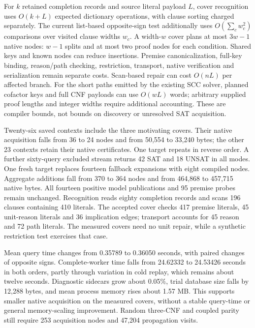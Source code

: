 \documentclass[11pt,a4paper]{article}
\numberwithin{equation}{section}
\theoremstyle{plain}
\theoremstyle{definition}
\theoremstyle{remark}
\begin{document}
For $k$ retained completion records and source literal payload $L$, cover
recognition uses $O(k+L)$ expected dictionary operations, with clause sorting
charged separately. The current list-based opposite-sign test additionally
uses $O(\sum_c w_c^2)$ comparisons over visited clause widths $w_c$.
A width-$w$ cover plans at most $3w-1$ native nodes:
$w-1$ splits and at most two proof nodes for each condition. Shared keys and
known nodes can reduce insertions. Premise canonicalization, full-key binding,
reason/path checking, restriction, transport, native verification and
serialization remain separate costs. Scan-based repair can cost $O(nL)$ per
affected branch. For the short paths emitted by the existing SCC solver,
planned cofactor keys and full CNF payloads can use $O(wL)$ words; arbitrary
supplied proof lengths and integer widths require additional accounting. These
are compiler bounds, not bounds on discovery or unresolved SAT acquisition.

Twenty-six saved contexts include the three motivating covers. Their native
acquisition falls from 36 to 24 nodes and from 50,554 to 33,240 bytes; the other
23 contexts retain their native certificates. One target repeats in reverse
order. A further sixty-query excluded stream returns 42 SAT and 18 UNSAT in
all modes. One fresh target replaces fourteen fallback expansions with eight
compiled nodes. Aggregate additions fall from 370 to 364 nodes and from
464,868 to 457,715 native bytes. All fourteen positive model publications and
95 premise probes remain unchanged. Recognition reads eighty completion
records and scans 196 clauses containing 410 literals. The accepted cover
checks 417 premise literals, 45 unit-reason literals and 36 implication edges;
transport accounts for 45 reason and 72 path literals. The measured covers
need no unit repair, while a synthetic restriction test exercises that case.

Mean query time changes from 0.35789 to 0.36050 seconds, with paired changes
of opposite signs. Complete-worker time falls from 24.62332 to 24.53426 seconds
in both orders, partly through variation in cold replay, which remains about
twelve seconds. Diagnostic sidecars grow about 0.05\%, trial database size
falls by 12,288 bytes, and mean process memory rises about 1.57 MB. This supports
smaller native acquisition on the measured covers, without a stable query-time
or general memory-scaling improvement. Random three-CNF and coupled parity
still require 253 acquisition nodes and 47,204 propagation visits.
\end{document}
